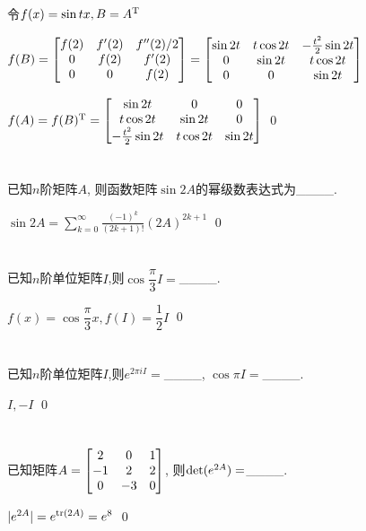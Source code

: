 \documentclass{matrix-homework}
\begin{document}
\answer
令$f(x)=\sin tx, B=A^{\mathrm{T}}$

$f(B)= \begin{bmatrix}f(2)&f'(2)&f''(2)/2\\0&f(2)&f'(2)\\0&0&f(2)\end{bmatrix}= \begin{bmatrix}\sin 2t&t\cos 2t&-\frac{t^2}{2} \sin 2t\\0&\sin 2t&t\cos 2t\\0&0&\sin 2t\end{bmatrix}$

$f(A)=f(B)^{\mathrm{T}}=\begin{bmatrix}\sin 2t&0&0\\t\cos 2t&\sin 2t&0\\-\frac{t^2}{2} \sin 2t&t\cos 2t&\sin 2t\end{bmatrix}$
\qed


\section{}
已知$n$阶矩阵$A$, 则函数矩阵$\sin 2A$的幂级数表达式为\_\_\_\_.

\answer
$\displaystyle\sin 2A=\sum_{k=0}^{\infty}\frac{(-1)^k}{(2k+1)!}(2A)^{2k+1}$
\qed


\section{}
已知$n$阶单位矩阵$I$,则$\cos \dfrac{\pi}{3}I=$\_\_\_\_.

\answer
$f(x)=\cos \dfrac{\pi}{3}x, f(I)=\dfrac{1}{2}I$
\qed


\section{}
已知$n$阶单位矩阵$I$,则$e^{2\pi iI}=$\_\_\_\_, $\cos\pi I=$\_\_\_\_.

\answer
$I,-I$
\qed


\section{}
已知矩阵$A=\begin{bmatrix}2&0&1\\-1&2&2\\0&-3&0\end{bmatrix}$, 则$\mathrm{det}(e^{2A})=$\_\_\_\_.

\answer
$|e^{2A}|=e^{\mathrm{tr}(2A)}=e^8$
\qed
\end{document}
